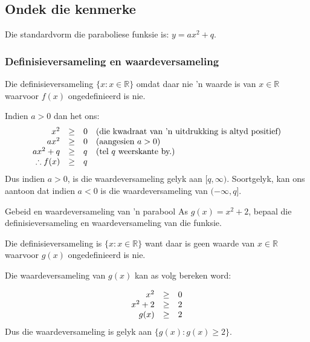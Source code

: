 \subsection*{Ondek die kenmerke}
Die standardvorm die paraboliese funksie is:  $y=ax^{2} + q$.
\subsubsection*{Definisieversameling en waardeversameling}

Die definisieversameling $\{x:x\in \mathbb{R}\}$ omdat daar nie ’n waarde is van $x\in \mathbb{R}$ waarvoor $f(x)$ ongedefinieerd is nie.\par 

Indien $a>0$ dan het ons:
\begin{equation*}
\begin{array}{cccl}\hfill {x}^{2}& \geq & 0\hfill & (\mbox{die kwadraat van ’n uitdrukking is altyd positief})\hfill \\
 \hfill a{x}^{2}& \geq & 0\hfill & (\mbox{aangesien } a>0)\hfill \\
 \hfill a{x}^{2}+q& \geq & q\hfill & (\mbox{tel $q$ weerskante by.}) \\
 \hfill \therefore f(x)& \geq & q\hfill & 
\end{array}
\end{equation*}
Dus indien $a>0$, is die waardeversameling gelyk aan $[q,\infty )$. Soortgelyk, kan ons aantoon dat indien  $a<0$ is die waardeversameling van $ (-\infty ,q]$. 

\begin{wex}{Gebeid en waardeversameling van 'n parabool}
{As $g(x)={x}^{2}+2$, bepaal die definisieversameling en waardeversameling van die funksie.}
{
Die definisieversameling is $\{x:x\in \mathbb{R}\}$ want daar is geen waarde van $x\in \mathbb{R}$ waarvoor $g(x)$ ongedefinieerd is nie.

Die waardeversameling van $g(x)$ kan as volg bereken word:

\begin{equation*}
\begin{array}{ccc}\hfill {x}^{2}& \geq & 0\hfill \\
 \hfill {x}^{2}+2& \geq & 2\hfill \\
 \hfill g(x)& \geq & 2\hfill 
\end{array}
\end{equation*}
Dus die waardeversameling is gelyk aan $\{g(x):g(x)\geq 2\}$.
}
\end{wex}



